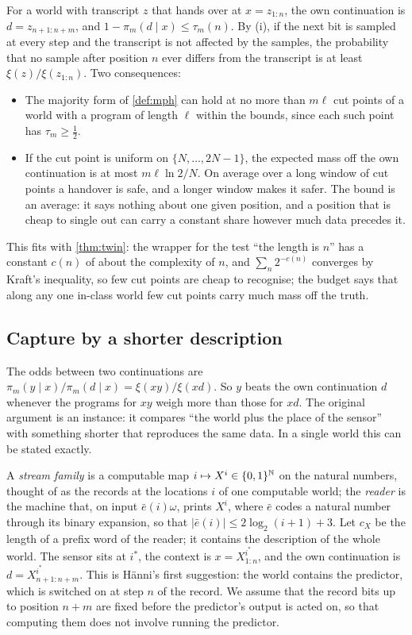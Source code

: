 For a world with transcript $z$ that hands over at $x=z_{1:n}$, the own continuation is $d=z_{n+1:n+m}$, and
$1-\pi_m(d\mid x)\le\tau_m(n)$. By (i), if the next bit is sampled at every step and the transcript is not
affected by the samples, the probability that no sample after position $n$ ever differs from the transcript is
at least $\xi(z)/\xi(z_{1:n})$. Two consequences:
\begin{itemize}[leftmargin=1.4em,itemsep=1pt,topsep=2pt]
\item The majority form of \cref{def:mph} can hold at no more than $m\ell$ cut points of a world
with a program of length $\ell$ within the bounds, since each such point has $\tau_m\ge\frac12$.
\item If the cut point is uniform on $\{N,\dots,2N-1\}$, the expected mass off the own continuation is at most
$m\ell\ln2/N$. On average over a long window of cut points a handover is safe, and a longer window makes it
safer. The bound is an average: it says nothing about one given position, and a position that is cheap to
single out can carry a constant share however much data precedes it.
\end{itemize}
This fits with \cref{thm:twin}: the wrapper for the test ``the length is $n$'' has a constant $c(n)$ of
about the complexity of $n$, and $\sum_n2^{-c(n)}$ converges by Kraft's inequality, so few cut points are cheap
to recognise; the budget says that along any one in-class world few cut points carry much mass off the truth.

\subsection{Capture by a shorter description}\label{sec:capture}

The odds between two continuations are $\pi_m(y\mid x)/\pi_m(d\mid x)=\xi(xy)/\xi(xd)$. So $y$ beats the own
continuation $d$ whenever the programs for $xy$ weigh more than those for $xd$. The original argument is an
instance: it compares ``the world plus the place of the sensor'' with something shorter that reproduces the
same data. In a single world this can be stated exactly.

A \emph{stream family} is a computable map $i\mapsto X^i\in\{0,1\}^{\mathbb{N}}$ on the natural numbers, thought of
as the records at the locations $i$ of one computable world; the \emph{reader} is the machine that, on
input $\bar e(i)\omega$, prints $X^i$, where $\bar e$ codes a natural number through its binary expansion, so
that $|\bar e(i)|\le2\log_2(i+1)+3$. Let $c_X$ be the length of a prefix word of the reader; it contains the
description of the whole world. The sensor sits
at $i^*$, the context is $x=X^{i^*}_{1:n}$, and the own continuation is $d=X^{i^*}_{n+1:n+m}$. This is
H\"anni's first suggestion: the world contains the predictor, which is switched on at step $n$ of the record.
We assume that the record bits up to position $n+m$ are fixed before the predictor's output is acted on, so
that computing them does not involve running the predictor.


